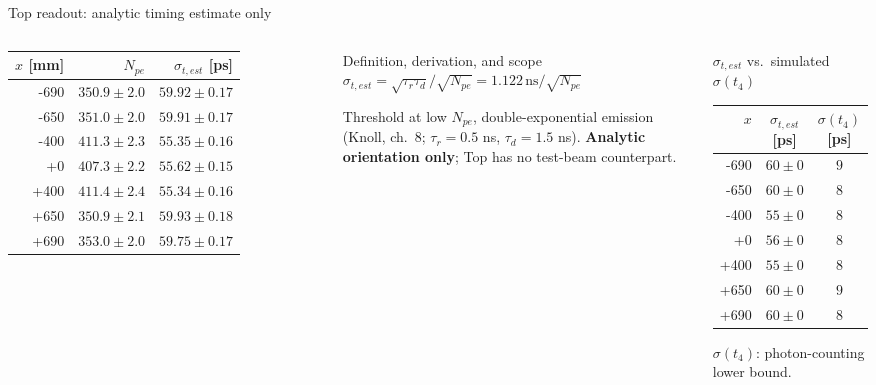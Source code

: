 \documentclass[aspectratio=169]{beamer}
\begin{document}
\begin{frame}{Top readout: analytic timing estimate only}

\begin{columns}[T]
\scriptsize\setlength{\tabcolsep}{4pt}
\begin{tabular}{rrr}\toprule
$x$ [mm] & $N_{pe}$ & $\sigma_{t,est}$ [ps] \\ \midrule
-690 & $350.9\pm2.0$ & $59.92\pm0.17$ \\
-650 & $351.0\pm2.0$ & $59.91\pm0.17$ \\
-400 & $411.3\pm2.3$ & $55.35\pm0.16$ \\
+0 & $407.3\pm2.2$ & $55.62\pm0.15$ \\
+400 & $411.4\pm2.4$ & $55.34\pm0.16$ \\
+650 & $350.9\pm2.1$ & $59.93\pm0.18$ \\
+690 & $353.0\pm2.0$ & $59.75\pm0.17$ \\
\bottomrule\end{tabular}
\begin{block}{\footnotesize Definition, derivation, and scope}
\scriptsize $\sigma_{t,est}=\sqrt{\tau_r\tau_d}/\sqrt{N_{pe}}
=1.122\,\mathrm{ns}/\sqrt{N_{pe}}$
\par Threshold at low $N_{pe}$, double-exponential emission
(Knoll, ch.\ 8; $\tau_r=0.5$ ns, $\tau_d=1.5$ ns).
\textbf{Analytic orientation only}; Top has no test-beam counterpart.
\end{block}
\begin{block}{\footnotesize $\sigma_{t,est}$ vs.\ simulated $\sigma(t_4)$}
\tiny\setlength{\tabcolsep}{3pt}\begin{tabular}{rcc}\toprule
$x$ & $\sigma_{t,est}$ [ps] & $\sigma(t_4)$ [ps]\\ \midrule
-690 & $60\pm0$ & $9$ \\
-650 & $60\pm0$ & $8$ \\
-400 & $55\pm0$ & $8$ \\
+0 & $56\pm0$ & $8$ \\
+400 & $55\pm0$ & $8$ \\
+650 & $60\pm0$ & $9$ \\
+690 & $60\pm0$ & $8$ \\
\bottomrule\end{tabular}
\par\tiny $\sigma(t_4)$: photon-counting lower bound.
\end{block}
\end{columns}

\end{frame}
\end{document}
